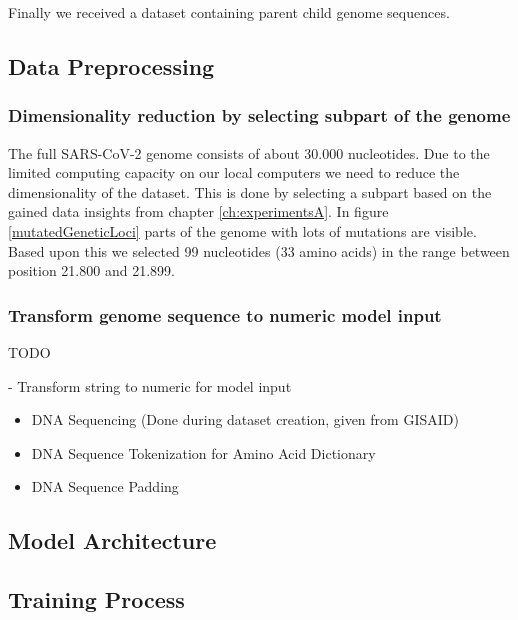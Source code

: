 Finally we received a dataset containing parent child genome sequences.

\subsection{Data Preprocessing}  \label{ch:approachB}

\subsubsection{Dimensionality reduction by selecting subpart of the genome}
\label{ch:approachBa}

The full \ac{SARS-CoV-2} genome consists of about 30.000 nucleotides. Due to the limited computing capacity on our local computers we need to reduce the dimensionality of the dataset. This is done by selecting a subpart based on the gained data insights from chapter \ref{ch:experimentsA}. In figure \ref{mutatedGeneticLoci} parts of the genome with lots of mutations are visible. Based upon this we selected 99 nucleotides (33 amino acids) in the range between position 21.800 and 21.899.

\subsubsection{Transform genome sequence to numeric model input}
\label{ch:approachBb}

TODO

- Transform string to numeric for model input

\begin{itemize}
	\item DNA Sequencing (Done during dataset creation, given from GISAID)
	\item DNA Sequence Tokenization for Amino Acid Dictionary
	\item DNA Sequence Padding
\end{itemize}

\subsection{Model Architecture}  \label{ch:approachC}

\subsection{Training Process} \label{ch:approachD}

\newpage
